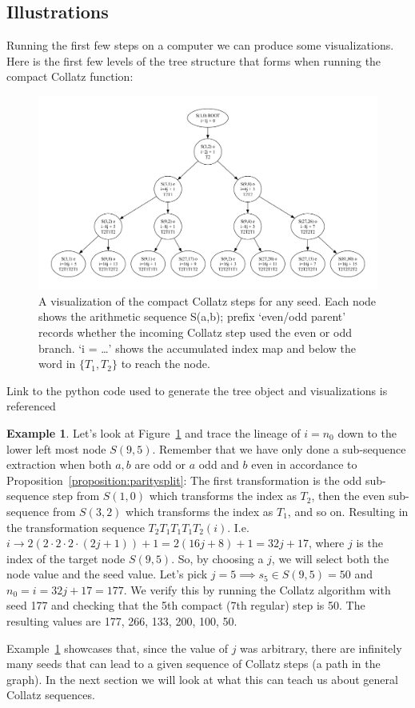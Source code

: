 \documentclass{article}
\theoremstyle{definition}
\newtheorem{example}{Example}[section]
\begin{document}
\subsection*{Illustrations}
Running the first few steps on a computer we can produce some visualizations. Here is the first few levels of the tree structure that forms when running the compact Collatz function:
\begin{figure}[H]
\begin{center} 
\includegraphics[width=1.0\textwidth]{tree_illustration.pdf}
\caption{A visualization of the compact Collatz steps for any seed. Each node shows the arithmetic sequence S(a,b); prefix ‘even/odd parent’ records whether the incoming Collatz step used the even or odd branch. ‘i = …’ shows the accumulated index map and below the word in $\{T_1,T_2\}$ to reach the node.}
\label{fig:fig2}
\end{center}
\end{figure}
%
Link to the python code used to generate the tree object and visualizations is referenced \cite{Angermund2025}
%
\begin{example}\label{example:ex2}
Let's look at Figure~\ref{fig:fig2} and trace the lineage of $i=n_0$ down to the lower left most node $S(9,5)$. Remember that we have only done a sub-sequence extraction when both $a,b$ are odd or $a$ odd and $b$ even in accordance to Proposition~\ref{proposition:paritysplit}:
The first transformation is the odd sub-sequence step from $S(1,0)$ which transforms the index as $T_2$, then the even sub-sequence from $S(3,2)$ which transforms the index as $T_1$, and so on. Resulting in the transformation sequence $T_2T_1T_1T_1T_2(i)$. I.e. $i \longrightarrow 2(2\cdot2\cdot2\cdot(2j+1))+1 = 2(16j+8)+1 = 32j+17$, where $j$ is the index of the target node $S(9,5)$.
So, by choosing a $j$, we will select both the node value and the seed value. Let's pick $j=5 \implies s_5\in S(9,5) = 50$ and $n_0 = i = 32j+17 = 177$. We verify this by running the Collatz algorithm with seed 177 and checking that the 5th compact (7th regular) step is 50. The resulting values are 177, 266, 133, 200, 100, 50.
\end{example}
%
Example~\ref{example:ex2} showcases that, since the value of $j$ was arbitrary, there are infinitely many seeds that can lead to a given sequence of Collatz steps (a path in the graph). In the next section we will look at what this can teach us about general Collatz sequences.
\end{document}
